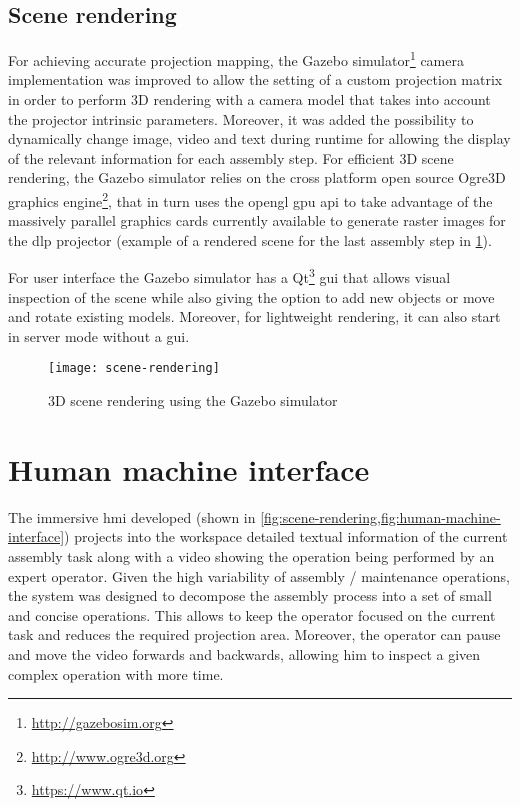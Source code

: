 \subsection{Scene rendering}

For achieving accurate projection mapping, the Gazebo simulator\footnote{\url{http://gazebosim.org}} camera implementation was improved to allow the setting of a custom projection matrix in order to perform 3D rendering with a camera model that takes into account the projector intrinsic parameters. Moreover, it was added the possibility to dynamically change image, video and text during runtime for allowing the display of the relevant information for each assembly step.
For efficient 3D scene rendering, the Gazebo simulator relies on the cross platform open source Ogre3D graphics engine\footnote{\url{http://www.ogre3d.org}}, that in turn uses the \gls{opengl} \gls{gpu} \gls{api} to take advantage of the massively parallel graphics cards currently available to generate raster images for the \gls{dlp} projector (example of a rendered scene for the last assembly step in \cref{fig:scene-rendering}).

For user interface the Gazebo simulator has a Qt\footnote{\url{https://www.qt.io}} \gls{gui} that allows visual inspection of the scene while also giving the option to add new objects or move and rotate existing models. Moreover, for lightweight rendering, it can also start in server mode without a \gls{gui}.

\begin{figure}[ht]
	\centering
	\texttt{[image: scene-rendering]}
	\caption{3D scene rendering using the Gazebo simulator}
	\label{fig:scene-rendering}
\end{figure}



\section{Human machine interface}\label{sec:human-machine-interaction}

The immersive \gls{hmi} developed (shown in \cref{fig:scene-rendering,fig:human-machine-interface}) projects into the workspace detailed textual information of the current assembly task along with a video showing the operation being performed by an expert operator. Given the high variability of assembly / maintenance operations, the system was designed to decompose the assembly process into a set of small and concise operations. This allows to keep the operator focused on the current task and reduces the required projection area. Moreover, the operator can pause and move the video forwards and backwards, allowing him to inspect a given complex operation with more time.

